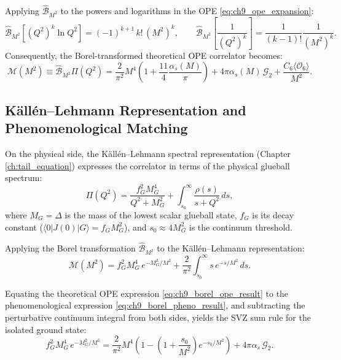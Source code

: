 Applying $\hat{\mathcal{B}}_{M^2}$ to the powers and logarithms in the OPE \eqref{eq:ch9_ope_expansion}:
\begin{equation}
\hat{\mathcal{B}}_{M^2} \left[ (Q^2)^k \ln Q^2 \right] = (-1)^{k+1} \, k! \, (M^2)^k, \qquad \hat{\mathcal{B}}_{M^2} \left[ \frac{1}{(Q^2)^k} \right] = \frac{1}{(k-1)!} \frac{1}{(M^2)^k}.
\end{equation}
Consequently, the Borel-transformed theoretical OPE correlator becomes:
\begin{equation}
\label{eq:ch9_borel_ope_result}
\mathcal{M}(M^2) \equiv \hat{\mathcal{B}}_{M^2} \Pi(Q^2) = \frac{2}{\pi^2} M^4 \left( 1 + \frac{11}{4} \frac{\alpha_s(M)}{\pi} \right) + 4\pi \alpha_s(M) \, \mathcal{G}_2 + \frac{C_6 \langle \mathcal{O}_6 \rangle}{M^2}.
\end{equation}

\subsection{K{\"a}ll{\'e}n--Lehmann Representation and Phenomenological Matching}
\label{subsec:kallen_lehmann_pheno}

On the physical side, the K{\"a}ll{\'e}n--Lehmann spectral representation (Chapter \ref{ch:tail_equation}) expresses the correlator in terms of the physical glueball spectrum:
\begin{equation}
\label{eq:ch9_kallen_lehmann_sum_rule}
\Pi(Q^2) = \frac{f_G^2 M_G^4}{Q^2 + M_G^2} + \int_{s_0}^\infty \frac{\rho(s)}{s + Q^2} \, ds,
\end{equation}
where $M_G = \Delta$ is the mass of the lowest scalar glueball state, $f_G$ is its decay constant ($\langle 0 | J(0) | G \rangle = f_G M_G^2$), and $s_0 \approx 4 M_G^2$ is the continuum threshold.

Applying the Borel transformation $\hat{\mathcal{B}}_{M^2}$ to the K{\"a}ll{\'e}n--Lehmann representation:
\begin{equation}
\label{eq:ch9_borel_pheno_result}
\mathcal{M}(M^2) = f_G^2 M_G^4 \, e^{-M_G^2 / M^2} + \frac{2}{\pi^2} \int_{s_0}^\infty s \, e^{-s / M^2} \, ds.
\end{equation}

Equating the theoretical OPE expression \eqref{eq:ch9_borel_ope_result} to the phenomenological expression \eqref{eq:ch9_borel_pheno_result}, and subtracting the perturbative continuum integral from both sides, yields the SVZ sum rule for the isolated ground state:
\begin{equation}
\label{eq:ch9_svz_master_sum_rule}
f_G^2 M_G^4 \, e^{-M_G^2 / M^2} = \frac{2}{\pi^2} M^4 \left( 1 - \left( 1 + \frac{s_0}{M^2} \right) e^{-s_0 / M^2} \right) + 4\pi \alpha_s \, \mathcal{G}_2.
\end{equation}

